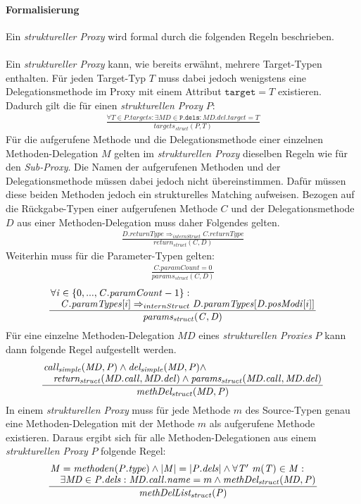 \paragraph{Formalisierung}
Ein \emph{struktureller Proxy} wird formal durch die folgenden Regeln beschrieben.
\\\\
Ein \emph{struktureller Proxy} kann, wie bereits erwähnt, mehrere Target-Typen enthalten.
Für jeden Target-Typ $T$ muss dabei jedoch wenigstens eine Delegationsmethode im Proxy mit einem Attribut $\texttt{target} = T$ existieren. Dadurch gilt die für einen \emph{strukturellen Proxy} $P$:
\begin{gather*}
\frac{\forall \mathit{T} \in \mathit{P.targets}:\exists \mathit{MD} \in \mathtt{P.dels}:\mathit{MD.del.target} = T}{\mathit{targets_{struct}(P, T)}}
\end{gather*}
Für die aufgerufene Methode und die Delegationsmethode einer einzelnen Methoden-Delegation $\mathit{M}$ gelten im \emph{strukturellen Proxy} dieselben Regeln wie für den \emph{Sub-Proxy}. Die Namen der aufgerufenen Methoden und der Delegationsmethode müssen dabei jedoch nicht übereinstimmen. Dafür müssen diese beiden Methoden jedoch ein strukturelles Matching aufweisen. Bezogen auf die Rückgabe-Typen einer aufgerufenen Methode $\mathit{C}$ und der Delegationsmethode $\mathit{D}$ aus einer Methoden-Delegation muss daher Folgendes gelten.
\begin{gather*}
\frac{\mathit{D.returnType} \Rightarrow_{internStruct} \mathit{C.returnType}}{\mathit{return_{struct}(C,D)}}
\end{gather*} 
Weiterhin muss für die Parameter-Typen gelten:
\begin{gather*}
\frac{\mathit{C.paramCount} = 0}{\mathit{params_{struct}(C,D)}}
\end{gather*} 
\begin{gather*}
\frac{\splitfrac{\forall \mathit{i} \in \{0,...,\mathit{C.paramCount}-1\}:}
{ \mathit{C.paramTypes}[i] \Rightarrow_{internStruct} \mathit{D.paramTypes}[\mathit{D.posModi}[i]]
}}{\mathit{params_{struct}(C,D)}}
\end{gather*} 
Für eine einzelne Methoden-Delegation $\mathit{MD}$ eines \emph{strukturellen Proxies} $P$ kann dann folgende Regel aufgestellt werden.
\begin{gather*}
\frac{\splitfrac{\mathit{call_{simple}(MD,P)} \wedge \mathit{del_{simple}(MD,P)} \wedge} {\mathit{return_{struct}(MD.call, MD.del)} \wedge \mathit{params_{struct}(MD.call, MD.del)}}
}
{\mathit{methDel_{struct}(MD,P)}}
\end{gather*}
In einem \emph{strukturellen Proxy} muss für jede Methode $m$ des Source-Typen genau eine Methoden-Delegation mit der Methode $m$ als aufgerufene Methode existieren. Daraus ergibt sich für alle Methoden-Delegationen aus einem \emph{strukturellen Proxy} $P$ folgende Regel:
\begin{gather*}
\frac{\splitfrac{\mathit{M} = \mathit{methoden(P.type)} \wedge |\mathit{M}| = |\mathit{P.dels}| \wedge \forall \mathit{T' \text{ }m(T)} \in \mathit{M}:}{\exists \mathit{MD} \in \mathit{P.dels}:\mathit{MD.call.name} = m \wedge \mathit{methDel_{struct}(MD,P)}
 }
}
{\mathit{methDelList_{struct}(P)}}
\end{gather*}

